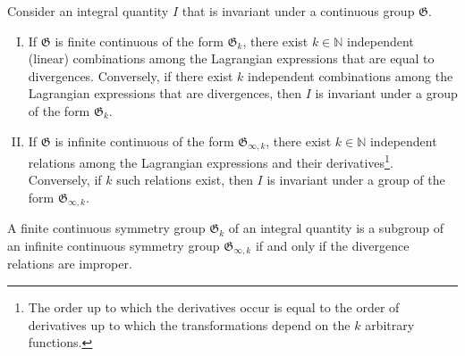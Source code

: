     \begin{theorem}[Noether]\label{var:noether}
        Consider an integral quantity $I$ that is invariant under a continuous group $\mathfrak{G}$.
        \begin{enumerate}[I)]
            \item If $\mathfrak{G}$ is finite continuous of the form $\mathfrak{G}_k$, there exist $k\in\mathbb{N}$ independent (linear) combinations among the Lagrangian expressions that are equal to divergences. Conversely, if there exist $k$ independent combinations among the Lagrangian expressions that are divergences, then $I$ is invariant under a group of the form $\mathfrak{G}_k$.
            \item If $\mathfrak{G}$ is infinite continuous of the form $\mathfrak{G}_{\infty,k}$, there exist $k\in\mathbb{N}$ independent relations among the Lagrangian expressions and their derivatives\footnote{The order up to which the derivatives occur is equal to the order of derivatives up to which the transformations depend on the $k$ arbitrary functions.}. Conversely, if $k$ such relations exist, then $I$ is invariant under a group of the form $\mathfrak{G}_{\infty,k}$.
        \end{enumerate}
    \end{theorem}

    \begin{theorem}\label{var:noether_third_theorem}
        A finite continuous symmetry group $\mathfrak{G}_k$ of an integral quantity is a subgroup of an infinite continuous symmetry group $\mathfrak{G}_{\infty,k}$ if and only if the divergence relations are improper.
    \end{theorem}

